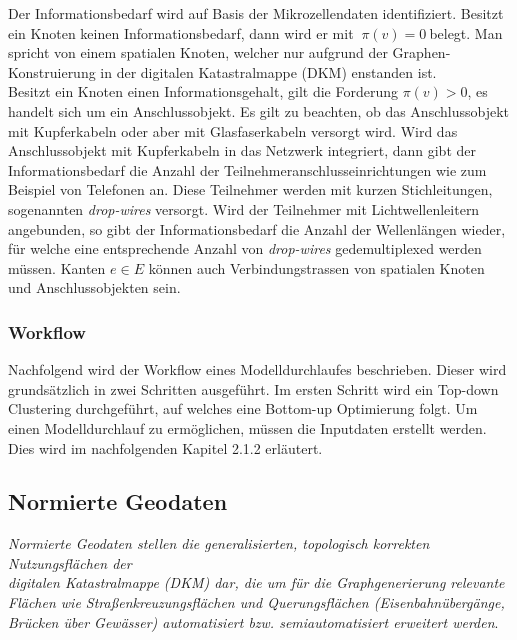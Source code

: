 Der Informationsbedarf wird auf Basis der Mikrozellendaten identifiziert. Besitzt ein Knoten keinen Informationsbedarf, dann wird er mit $~\pi(v)=0~$belegt.
Man spricht von einem spatialen Knoten, welcher nur aufgrund der Graphen-Konstruierung in der digitalen Katastralmappe (DKM) enstanden ist.\\
Besitzt ein Knoten einen Informationsgehalt, gilt die Forderung $\pi(v)>0$, es handelt sich um ein Anschlussobjekt.
Es gilt zu beachten, ob das Anschlussobjekt mit Kupferkabeln oder aber mit Glasfaserkabeln versorgt wird. Wird das Anschlussobjekt mit Kupferkabeln in
das Netzwerk integriert, dann gibt der Informationsbedarf die Anzahl der Teilnehmeranschlusseinrichtungen wie zum Beispiel von Telefonen an. 
Diese Teilnehmer werden mit kurzen Stichleitungen, sogenannten \textit{drop-wires} versorgt. 
Wird der Teilnehmer mit Lichtwellenleitern angebunden, so gibt der Informationsbedarf die Anzahl der Wellenlängen wieder, für welche eine entsprechende
Anzahl von \textit{drop-wires} gedemultiplexed werden müssen. 
Kanten $e \in E$ können auch Verbindungstrassen von spatialen Knoten und Anschlussobjekten sein. 


\subsubsection{Workflow}
\label{sec:2 modelle}


\vspace{0.5cm}

\par Nachfolgend wird der Workflow eines Modelldurchlaufes beschrieben. Dieser wird grundsätzlich in zwei Schritten ausgeführt.
Im ersten Schritt wird ein Top-down Clustering durchgeführt, auf welches eine Bottom-up Optimierung folgt.
Um einen Modelldurchlauf zu ermöglichen, müssen die Inputdaten erstellt werden. Dies wird im nachfolgenden Kapitel 2.1.2 erläutert. 
\vspace{1cm}

\subsection{Normierte Geodaten}
\label{sec:2 modelle}


\vspace{0.5cm}

{\em Normierte Geodaten stellen die generalisierten, topologisch korrekten Nutzungsflächen der\\ digitalen Katastralmappe (DKM) dar, die um für die
Graphgenerierung relevante Flächen wie Straßenkreuzungsflächen und Querungsflächen (Eisenbahnübergänge, Brücken über Gewässer) automatisiert
bzw. semiautomatisiert erweitert werden}\cite{prossegger1}.

